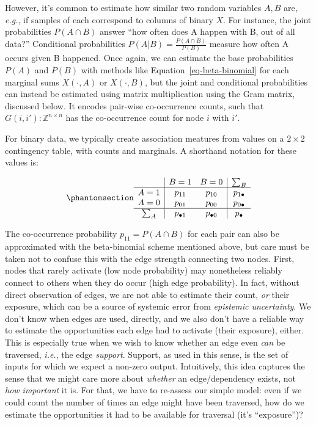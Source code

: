 \documentclass[%
	12pt,
		oneside,
		letterpaper
]{book}
\begin{document}
However, it's common to estimate how similar two random variables
\(A,B\) are, \emph{e.g.}, if samples of each correspond to columns of
binary \(X\). For instance, the joint probabilities \(P(A\cap B)\)
answer ``how often does A happen with B, out of all data?'' Conditional
probabilities \(P(A|B)=\frac{P(A\cap B)}{P(B)}\) measure how often A
occurs given B happened. Once again, we can estimate the base
probabilities \(P(A)\) and \(P(B)\) with methods like
Equation~\ref{eq-beta-binomial} for each marginal sums \(X(\cdot,A)\) or
\(X(\cdot,B)\), but the joint and conditional probabilities can instead
be estimated using matrix multiplication using the Gram matrix,
discussed below. It encodes pair-wise co-occurrence counts, such that
\(G(i,i'):\mathbb{Z}^{n\times n}\) has the co-occurrence count for node
\(i\) with \(i'\).

For binary data, we typically create association meatures from values on
a \(2\times2\) contingency table, with counts and marginals. A shorthand
notation for these values is:

\begin{equation}\phantomsection\label{eq-contingency}{
\begin{array}{c|cc|c}
      & B=1         & B=0         & \sum_B \\
\hline 
A=1   & p_{11}      & p_{10}      & p_{1\bullet} \\
A=0   & p_{01}      & p_{00}      & p_{0\bullet} \\
\hline 
\sum_A   & p_{\bullet 1} & p_{\bullet 0} & p_\bullet \\
\end{array}
}\end{equation}

The co-occurrence probability \(p_{11}=P(A\cap B)\) for each pair can
also be approximated with the beta-binomial scheme mentioned above, but
care must be taken not to confuse this with the edge strength connecting
two nodes. First, nodes that rarely activate (low node probability) may
nonetheless reliably connect to others when they do occur (high edge
probability). In fact, without direct observation of edges, we are not
able to estimate their count, \emph{or} their exposure, which can be a
source of systemic error from \emph{epistemic uncertainty}. We don't
know when edges are used, directly, and we also don't have a reliable
way to estimate the opportunities each edge had to activate (their
exposure), either. This is especially true when we wish to know whether
an edge even \emph{can} be traversed, \emph{i.e.}, the edge
\emph{support}. Support, as used in this sense, is the set of inputs for
which we expect a non-zero output. Intuitively, this idea captures the
sense that we might care more about \emph{whether} an edge/dependency
exists, not \emph{how important} it is. For that, we have to re-assess
our simple model: even if we could count the number of times an edge
might have been traversed, how do we estimate the opportunities it had
to be available for traversal (it's ``exposure'')?
\end{document}
